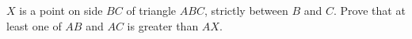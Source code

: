 $X$ is a point on side $BC$ of triangle $ABC$, strictly between $B$ and $C$. Prove that at least one of $AB$ and $AC$ is greater than $AX$.
